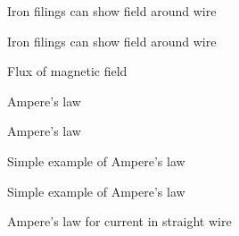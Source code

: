 \documentclass[compress]{beamer}
\makeatletter
\let\beamer@writeslidentry@miniframeson=\beamer@writeslidentry
\def\beamer@writeslidentry@miniframesoff{%
  \expandafter\beamer@ifempty\expandafter{\beamer@framestartpage}{}%
  {%
    \clearpage\beamer@notesactions%
  }
}
\newcommand*{\miniframeson}{\let\beamer@writeslidentry=\beamer@writeslidentry@miniframeson}
\newcommand*{\miniframesoff}{\let\beamer@writeslidentry=\beamer@writeslidentry@miniframesoff}
\makeatother
\begin{document}
{
    \begin{frame}{Iron filings can show field around wire}
    \end{frame}
}

\miniframesoff
{
    \begin{frame}{Iron filings can show field around wire}
    \end{frame}
}
\miniframeson


{
    \begin{frame}{Flux of magnetic field}
    \end{frame}
}


{
    \begin{frame}{Ampere's law}
    \end{frame}
}


{
    \begin{frame}{Ampere's law}
    \end{frame}
}


{
    \begin{frame}{Simple example of Ampere's law}
    \end{frame}
}

\miniframesoff
{
    \begin{frame}{Simple example of Ampere's law}
    \end{frame}
}
\miniframeson


{
    \begin{frame}{Ampere's law for current in straight wire}
    \end{frame}
}
\end{document}
